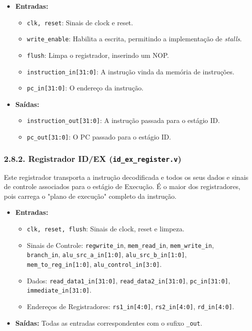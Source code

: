 \documentclass[12pt, a4paper]{article}
\begin{document}
\begin{itemize}
    \item \textbf{Entradas:}
    \begin{itemize}
        \item \texttt{clk, reset}: Sinais de clock e reset.
        \item \texttt{write\_enable}: Habilita a escrita, permitindo a implementação de \textit{stalls}.
        \item \texttt{flush}: Limpa o registrador, inserindo um NOP.
        \item \texttt{instruction\_in[31:0]}: A instrução vinda da memória de instruções.
        \item \texttt{pc\_in[31:0]}: O endereço da instrução.
    \end{itemize}
    \item \textbf{Saídas:}
    \begin{itemize}
        \item \texttt{instruction\_out[31:0]}: A instrução passada para o estágio ID.
        \item \texttt{pc\_out[31:0]}: O PC passado para o estágio ID.
    \end{itemize}
\end{itemize}

\subsubsection*{2.8.2. Registrador ID/EX (\texttt{id\_ex\_register.v})}
Este registrador transporta a instrução decodificada e todos os seus dados e sinais de controle associados para o estágio de Execução. É o maior dos registradores, pois carrega o "plano de execução" completo da instrução.

\begin{itemize}
    \item \textbf{Entradas:}
    \begin{itemize}
        \item \texttt{clk, reset, flush}: Sinais de clock, reset e limpeza.
        \item Sinais de Controle: \texttt{regwrite\_in}, \texttt{mem\_read\_in}, \texttt{mem\_write\_in}, \texttt{branch\_in}, \texttt{alu\_src\_a\_in[1:0]}, \texttt{alu\_src\_b\_in[1:0]}, \texttt{mem\_to\_reg\_in[1:0]}, \texttt{alu\_control\_in[3:0]}.
        \item Dados: \texttt{read\_data1\_in[31:0]}, \texttt{read\_data2\_in[31:0]}, \texttt{pc\_in[31:0]}, \texttt{immediate\_in[31:0]}.
        \item Endereços de Registradores: \texttt{rs1\_in[4:0]}, \texttt{rs2\_in[4:0]}, \texttt{rd\_in[4:0]}.
    \end{itemize}
    \item \textbf{Saídas:} Todas as entradas correspondentes com o sufixo \texttt{\_out}.
\end{itemize}
\end{document}

